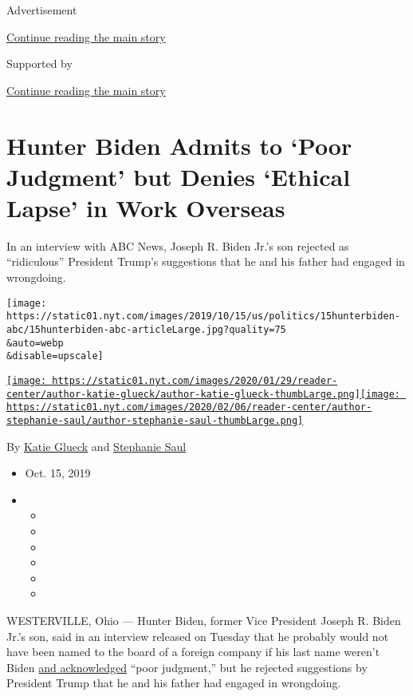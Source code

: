 Advertisement

\protect\hyperlink{after-top}{Continue reading the main story}

Supported by

\protect\hyperlink{after-sponsor}{Continue reading the main story}

\hypertarget{hunter-biden-admits-to-poor-judgment-but-denies-ethical-lapse-in-work-overseas}{%
\section{Hunter Biden Admits to `Poor Judgment' but Denies `Ethical
Lapse' in Work
Overseas}\label{hunter-biden-admits-to-poor-judgment-but-denies-ethical-lapse-in-work-overseas}}

In an interview with ABC News, Joseph R. Biden Jr.'s son rejected as
``ridiculous'' President Trump's suggestions that he and his father had
engaged in wrongdoing.

\texttt{[image: https://static01.nyt.com/images/2019/10/15/us/politics/15hunterbiden-abc/15hunterbiden-abc-articleLarge.jpg?quality=75\\\&auto=webp\\\&disable=upscale]}

\href{https://www.nytimes.com/by/katie-glueck}{\texttt{[image: https://static01.nyt.com/images/2020/01/29/reader-center/author-katie-glueck/author-katie-glueck-thumbLarge.png]}}\href{https://www.nytimes.com/by/stephanie-saul}{\texttt{[image: https://static01.nyt.com/images/2020/02/06/reader-center/author-stephanie-saul/author-stephanie-saul-thumbLarge.png]}}

By \href{https://www.nytimes.com/by/katie-glueck}{Katie Glueck} and
\href{https://www.nytimes.com/by/stephanie-saul}{Stephanie Saul}

\begin{itemize}
\item
  Oct. 15, 2019
\item
  \begin{itemize}
  \item
  \item
  \item
  \item
  \item
  \item
  \end{itemize}
\end{itemize}

WESTERVILLE, Ohio --- Hunter Biden, former Vice President Joseph R.
Biden Jr.'s son, said in an interview released on Tuesday that he
probably would not have been named to the board of a foreign company if
his last name weren't Biden
\href{https://abcnews.go.com/Politics/exclusive-hiding-plain-sight-hunter-biden-defends-foreign/story?id=66275416}{and
acknowledged} ``poor judgment,'' but he rejected suggestions by
President Trump that he and his father had engaged in wrongdoing.

